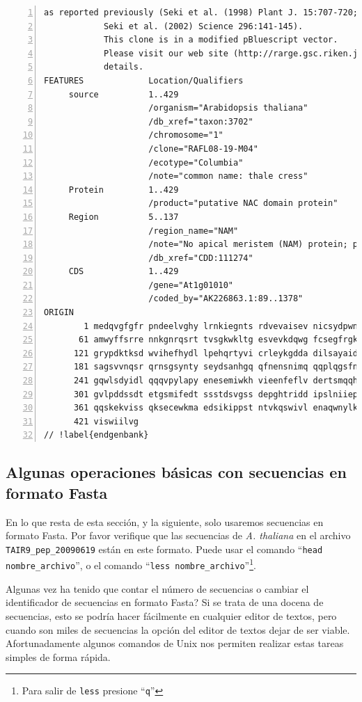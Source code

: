 \documentclass[letter,11pt]{book}
\begin{document}
\begin{Verbatim}[commandchars=!\{\},numbers=left,firstnumber=last,label=Secuencia en formato GenBank,frame=topline,fontsize=\tiny]
            as reported previously (Seki et al. (1998) Plant J. 15:707-720;
            Seki et al. (2002) Science 296:141-145).
            This clone is in a modified pBluescript vector.
            Please visit our web site (http://rarge.gsc.riken.jp/) for further
            details.
FEATURES             Location/Qualifiers
     source          1..429
                     /organism="Arabidopsis thaliana"
                     /db_xref="taxon:3702"
                     /chromosome="1"
                     /clone="RAFL08-19-M04"
                     /ecotype="Columbia"
                     /note="common name: thale cress"
     Protein         1..429
                     /product="putative NAC domain protein"
     Region          5..137
                     /region_name="NAM"
                     /note="No apical meristem (NAM) protein; pfam02365"
                     /db_xref="CDD:111274"
     CDS             1..429
                     /gene="At1g01010"
                     /coded_by="AK226863.1:89..1378"
ORIGIN      
        1 medqvgfgfr pndeelvghy lrnkiegnts rdvevaisev nicsydpwnl rfqskyksrd
       61 amwyffsrre nnkgnrqsrt tvsgkwkltg esvevkdqwg fcsegfrgki ghkrvlafld
      121 grypdktksd wvihefhydl lpehqrtyvi crleykgdda dilsayaidp tpafvpnmts
      181 sagsvvnqsr qrnsgsynty seydsanhgq qfnensnimq qqplqgsfnp lleydfanhg
      241 gqwlsdyidl qqqvpylapy enesemiwkh vieenfeflv dertsmqqhy sdhrpkkpvs
      301 gvlpddssdt etgsmifedt ssstdsvgss depghtridd ipslniiepl hnykaqeqpk
      361 qqskekviss qksecewkma edsikippst ntvkqswivl enaqwnylkn miigvllfis
      421 viswiilvg
// !label{endgenbank}
\end{Verbatim} 

\subsection{Algunas operaciones básicas con secuencias en formato Fasta}

En lo que resta de esta sección, y la siguiente, solo usaremos secuencias en formato Fasta. Por favor verifique que las secuencias de \textit{A. thaliana} en el archivo \Verb+TAIR9_pep_20090619+ están en este formato. Puede usar el comando ``\Verb+head nombre_archivo+'', o el comando ``\Verb+less nombre_archivo+''\footnote{Para salir de \Verb+less+ presione ``\Verb+q+''}.

{\textquestiondown}Algunas vez ha tenido que contar el número de secuencias o cambiar el identificador de secuencias en formato Fasta? Si se trata de una docena de secuencias, esto se podría hacer fácilmente en cualquier editor de textos, pero cuando son miles de secuencias la opción del editor de textos dejar de ser viable. Afortunadamente algunos comandos de Unix nos permiten realizar estas tareas simples de forma rápida.
\end{document}
